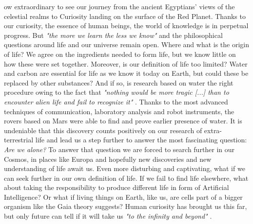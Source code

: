 ow extraordinary to see our journey from the ancient Egyptians' views of the celestial realms to Curiosity landing on the surface of the Red Planet. 
Thanks to our curiosity, the essence of human beings, the world of knowledge is in perpetual progress. 
But \emph{"the more we learn the less we know"} and the philosophical questions around life and our universe remain open.
Where and what is the origin of life? 
We agree on the ingredients needed to form life, but we know little on how these were set together. 
Moreover, is our definition of life too limited? 
Water and carbon are essential for life as we know it today on Earth, but could these be replaced by other substances? 
And if so, is research based on water the right procedure owing to the fact that \emph{"nothing would be more tragic [...] than to encounter alien life and fail to recognize it"} \cite{OForm3}. 
Thanks to the most advanced techniques of communication, laboratory analysis and robot instruments, the rovers based on Mars were able to find and prove earlier presence of water.
It is undeniable that this discovery counts positively on our research of extra-terrestrial life and lead us a step further to answer the most fascinating question: \emph{Are we alone?} 
To answer that question we are forced to search further in our Cosmos, in places like Europa and hopefully new discoveries and new understanding of life await us. 
Even more disturbing and captivating, what if we can seek further in our own definition of life. 
If we fail to find life elsewhere, what about taking the responsibility to produce different life in form of Artificial Intelligence? 
Or what if living things on Earth, like us, are cells part of a bigger organism like the Gaia theory suggests?
Human curiosity has brought us this far, but only future can tell if it will take us \emph{"to the infinity and beyond"} \cite{buzz}.